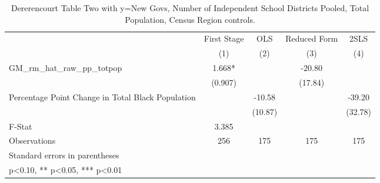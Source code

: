 \begin{table}[htbp]\centering
\def\sym#1{\ifmmode^{#1}\else\(^{#1}\)\fi}
\caption{Dererencourt Table Two with y=New Govs, Number of Independent School Districts  Pooled, Total Population, Census Region controls.}
\begin{tabular}{l*{4}{c}}
\toprule
                    & First Stage   &         OLS   &Reduced Form   &        2SLS   \\
                    &\multicolumn{1}{c}{(1)}   &\multicolumn{1}{c}{(2)}   &\multicolumn{1}{c}{(3)}   &\multicolumn{1}{c}{(4)}   \\
\midrule
GM\_rm\_hat\_raw\_pp\_totpop&       1.668*  &               &      -20.80   &               \\
                    &     (0.907)   &               &     (17.84)   &               \\
\addlinespace
Percentage Point Change in Total Black Population&               &      -10.58   &               &      -39.20   \\
                    &               &     (10.87)   &               &     (32.78)   \\
\midrule
F-Stat              &       3.385   &               &               &               \\
Observations        &         256   &         175   &         175   &         175   \\
\bottomrule
\multicolumn{5}{l}{\footnotesize Standard errors in parentheses}\\
\multicolumn{5}{l}{\footnotesize * p<0.10, ** p<0.05, *** p<0.01}\\
\end{tabular}
\end{table}
